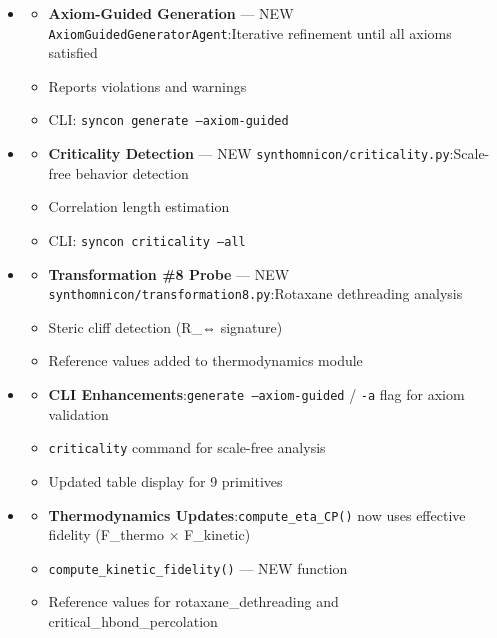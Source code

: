\documentclass[12pt,a4paper]{article}
\begin{document}
\begin{itemize}
\begin{itemize}
    \item 
    \begin{itemize}
    \item \textbf{Axiom-Guided Generation} --- NEW \texttt{AxiomGuidedGeneratorAgent}:Iterative refinement until all axioms satisfied
    \item Reports violations and warnings
    \item CLI: \texttt{syncon generate --axiom-guided}
\end{itemize}

    \item 
    \begin{itemize}
    \item \textbf{Criticality Detection} --- NEW \texttt{synthomnicon/criticality.py}:Scale-free behavior detection
    \item Correlation length estimation
    \item CLI: \texttt{syncon criticality --all}
\end{itemize}

    \item 
    \begin{itemize}
    \item \textbf{Transformation \#8 Probe} --- NEW \texttt{synthomnicon/transformation8.py}:Rotaxane dethreading analysis
    \item Steric cliff detection (R\_⇔ signature)
    \item Reference values added to thermodynamics module
\end{itemize}

    \item 
    \begin{itemize}
    \item \textbf{CLI Enhancements}:\texttt{generate --axiom-guided} / \texttt{-a} flag for axiom validation
    \item \texttt{criticality} command for scale-free analysis
    \item Updated table display for 9 primitives
\end{itemize}

    \item 
    \begin{itemize}
    \item \textbf{Thermodynamics Updates}:\texttt{compute\_eta\_CP()} now uses effective fidelity (F\_thermo $\times$ F\_kinetic)
    \item \texttt{compute\_kinetic\_fidelity()} --- NEW function
    \item Reference values for rotaxane\_dethreading and critical\_hbond\_percolation
\end{itemize}


\end{itemize}
\end{itemize}
\end{document}
